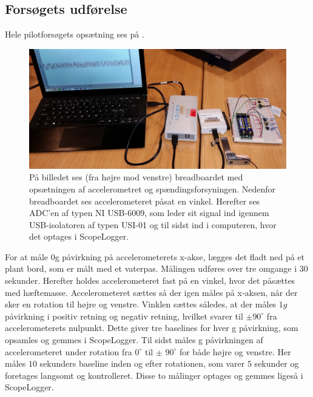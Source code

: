 \subsection{Forsøgets udførelse}
Hele pilotforsøgets opsætning ses på .
\begin{figure}[H]
	\centering
	\includegraphics[scale=0.14]{figures/cProblemloesning/Pilotforsoeg1_2.jpg}
	\caption{På billedet ses (fra højre mod venstre) breadboardet med opsætningen af accelerometret og spændingsforsyningen. Nedenfor breadboardet ses accelerometeret påsat en vinkel. Herefter ses ADC'en af typen NI USB-6009, som leder sit signal ind igennem USB-isolatoren af typen USI-01 og til sidst ind i computeren, hvor det optages i ScopeLogger.}
	\label{pforsoeg2}
\end{figure}
For at måle $0$g påvirkning på accelerometerets x-akse, lægges det fladt ned på et plant bord, som er målt med et vaterpas. Målingen udføres over tre omgange i $30$ sekunder. Herefter holdes accelerometeret fast på en vinkel, hvor det påsættes med hæftemasse. Accelerometeret sættes så der igen måles på x-aksen, når der sker en rotation til højre og venstre. Vinklen sættes således, at der måles $1g$ påvirkning i positiv retning og negativ retning, hvilket svarer til $\pm90^{\circ}$ fra accelerometerets nulpunkt. Dette giver tre baselines for hver g påvirkning, som opsamles og gemmes i ScopeLogger. %
Til sidst måles g påvirkningen af accelerometeret under rotation fra $0^{\circ}$ til $\pm$ $90^{\circ}$ for både højre og venstre. Her måles $10$ sekunders baseline inden og efter rotationen, som varer $5$ sekunder og foretages langsomt og kontrolleret. Disse to målinger optages og gemmes ligeså i ScopeLogger.

